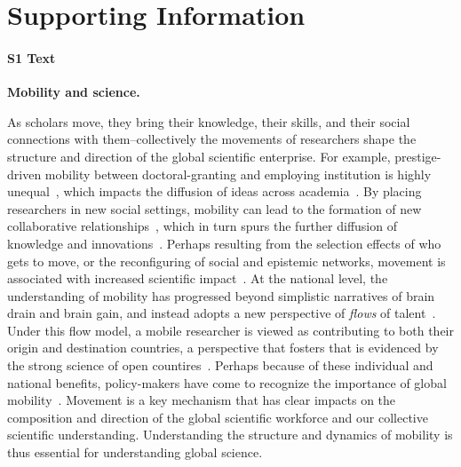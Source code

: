 \documentclass[12pt]{article} %
\newcommand{\beginsupplement}{%
        \setcounter{table}{0}
        \renewcommand{\thetable}{S\arabic{table}}%
        \setcounter{figure}{0}
        \renewcommand{\thefigure}{S\arabic{figure}}%
     }
\begin{document}
\clearpage
\beginsupplement
\section{Supporting Information}



%
%
\paragraph*{S1 Text}
\label{si:text:mobility_science}
{\bf Mobility and science.}

As scholars move, they bring their knowledge, their skills, and their social connections with them--collectively the movements of researchers shape the structure and direction of the global scientific enterprise.
For example, prestige-driven mobility between doctoral-granting and employing institution is highly unequal~\autocite{clauset2015hierarchy, deville2014career}, which impacts the diffusion of ideas across academia~\autocite{morgan2018prestige}.
By placing researchers in new social settings, mobility can lead to the formation of new collaborative relationships~\autocite{rodrigues2016mobility}, which in turn spurs the further diffusion of knowledge and innovations~\autocite{braunerhjelm2020labor, azoulay2011diffusion, kaiser2018innovation, armano2017innovation}.
Perhaps resulting from the selection effects of who gets to move, or the reconfiguring of social and epistemic networks, movement is associated with increased scientific impact~\autocite{sugimoto2017mostimpact, petersen2018multiscale, jonkers2013return, franzoni2014advantage}.
At the national level, the understanding of mobility has progressed beyond simplistic narratives of brain drain and brain gain, and instead adopts a new perspective of \textit{flows} of talent~\autocite{meyer2001network, ioannidis2014braindrain, gaillard1998circulation}.
Under this flow model, a mobile researcher is viewed as contributing to both their origin and destination countries, a perspective that fosters that is evidenced by the strong science of open countires~\autocite{wagner2017open}.
Perhaps because of these individual and national benefits, policy-makers have come to recognize the importance of global mobility~\autocite{box2008competition, oecd2010innovation}.
Movement is a key mechanism that has clear impacts on the composition and direction of the global scientific workforce and our collective scientific understanding.
Understanding the structure and dynamics of mobility is thus essential for understanding global science.
\end{document}
